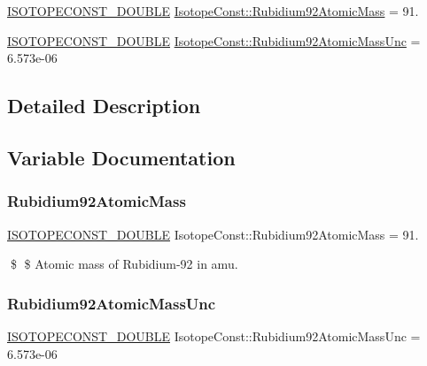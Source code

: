 \begin{DoxyCompactItemize}
\item 
\mbox{\hyperlink{group___isotope_const-_macros_ga8f45a7272ce02c0b4c65c44636ed719a}{I\+S\+O\+T\+O\+P\+E\+C\+O\+N\+S\+T\+\_\+\+D\+O\+U\+B\+LE}} \mbox{\hyperlink{group___isotope_const-_rubidium-_rb92_gaa311a46f6fa97322d6ef4c37a01149de}{Isotope\+Const\+::\+Rubidium92\+Atomic\+Mass}} = 91.
\item 
\mbox{\hyperlink{group___isotope_const-_macros_ga8f45a7272ce02c0b4c65c44636ed719a}{I\+S\+O\+T\+O\+P\+E\+C\+O\+N\+S\+T\+\_\+\+D\+O\+U\+B\+LE}} \mbox{\hyperlink{group___isotope_const-_rubidium-_rb92_ga5d14b57e128fd1c42fa4b388f8ee61c5}{Isotope\+Const\+::\+Rubidium92\+Atomic\+Mass\+Unc}} = 6.\+573e-\/06
\end{DoxyCompactItemize}


\subsection{Detailed Description}


\subsection{Variable Documentation}
\mbox{\label{group___isotope_const-_rubidium-_rb92_gaa311a46f6fa97322d6ef4c37a01149de}} 
\subsubsection{\texorpdfstring{Rubidium92\+Atomic\+Mass}{Rubidium92AtomicMass}}
{\footnotesize\ttfamily \mbox{\hyperlink{group___isotope_const-_macros_ga8f45a7272ce02c0b4c65c44636ed719a}{I\+S\+O\+T\+O\+P\+E\+C\+O\+N\+S\+T\+\_\+\+D\+O\+U\+B\+LE}} Isotope\+Const\+::\+Rubidium92\+Atomic\+Mass = 91.}

\$ \$ Atomic mass of Rubidium-\/92 in amu. \mbox{\label{group___isotope_const-_rubidium-_rb92_ga5d14b57e128fd1c42fa4b388f8ee61c5}} 
\subsubsection{\texorpdfstring{Rubidium92\+Atomic\+Mass\+Unc}{Rubidium92AtomicMassUnc}}
{\footnotesize\ttfamily \mbox{\hyperlink{group___isotope_const-_macros_ga8f45a7272ce02c0b4c65c44636ed719a}{I\+S\+O\+T\+O\+P\+E\+C\+O\+N\+S\+T\+\_\+\+D\+O\+U\+B\+LE}} Isotope\+Const\+::\+Rubidium92\+Atomic\+Mass\+Unc = 6.\+573e-\/06}

